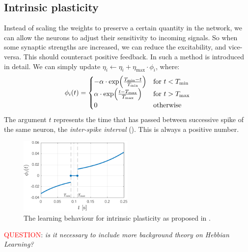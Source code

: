 \subsection{Intrinsic plasticity}
Instead of scaling the weights to preserve a certain quantity in the network, we can allow the neurons to adjust their sensitivity to incoming signals. So when some synaptic strengths are increased, we can reduce the excitability, and vice-versa. This should counteract positive feedback. In \cite{Song2017} such a method is introduced in detail. We can simply update $\eta_{i} \leftarrow \eta_{i} + \eta_{\max } \cdot \phi_{i}$, where: 
\begin{align}
\phi_{i} (t) =
\begin{cases}
-\alpha \cdot \exp \left(\frac{T_{\min }-t}{T_{\rm min }}\right) &\text {for } t<T_{ \rm min } \\ 
\alpha \cdot \exp \left(\frac{t-T_{\rm max }}{T_{\max }}\right) &\text {for } t >T_{\rm max } \\ 
0 &\text {otherwise }
\end{cases}
\end{align}
The argument $t$ represents the time that has passed between successive spike of the same neuron, the \textsl{inter-spike interval} (\ISI). This is always a positive number.

\begin{figure}[H]
\centering
\includegraphics[width = 0.5\textwidth]{../Figures/Learning/IPlearningFunction.pdf}
\caption{The learning behaviour for intrinsic plasticity as proposed in \cite{Song2017}.}
\label{fig:IPlearningFunction}
\end{figure}

\textcolor{red}{QUESTION}: \textsl{is it necessary to include more background theory on Hebbian Learning?}
